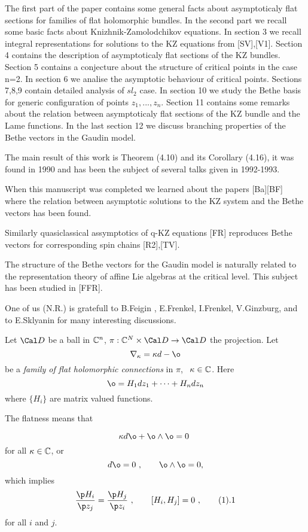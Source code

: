 The first part of the paper contains some general facts about
asymptoticaly flat sections for families of flat holomorphic
bundles. In the second part we recall some basic facts about
Knizhnik-Zamolodchikov equations. In section 3 we recall integral
representations for solutions to the KZ equations from [SV],[V1].
Section 4 contains the description of asymptoticaly flat sections
of the KZ bundles. Section 5 contains a conjecture about the structure
of critical points in the case n=2. In section 6 we analise the
asymptotic behaviour of critical points. Sections 7,8,9
contain detailed analysis of $sl_2$ case. In section 10
we study the Bethe basis for generic configuration of points
$z_1,...,z_n$. Section 11 contains some remarks about the
relation between asymptoticaly flat sections of the KZ bundle
and the Lame functions. In the last section 12 we discuss
branching properties of the Bethe vectors in the Gaudin model.

The main result of this work is Theorem (4.10) and its Corollary (4.16),
it was found in 1990 and
has been the subject of several talks given in 1992-1993.

When this manuscript was completed we learned about the papers [Ba][BF]
where the relation between asymptotic solutions to the KZ system
and the Bethe vectors has been found.

Similarly quasiclassical assymptotics of q-KZ equations [FR] reproduces
Bethe vectors for corresponding spin chains [R2],[TV].

The structure of the Bethe vectors for the Gaudin model is naturally related to
the representation theory of affine Lie algebras at the critical level.
This subject has been studied in [FFR].

One of us (N.R.) is gratefull to B.Feigin , E.Frenkel, I.Frenkel, V.Ginzburg,
and to E.Sklyanin for many interesting discussions.


\bigskip
{}

Let $\Cal D$ be a ball in $\Bbb C^n$, $\pi : \Bbb C ^N \times
 \Cal D\to\Cal D$ the projection. Let
$$
\nabla_\kappa = \kappa d-\o
$$
be a {\it family of flat holomorphic connections} in $\pi$, \
$\kappa\in\Bbb C$. Here
$$
\o = H_1 dz_1 +\dots + H_n dz_n
$$
where $\{ H_i\}$ are matrix valued functions.

The flatness means that

$$
\kappa d\o + \o\wedge\o = 0  \
$$
for all $\kappa\in\Bbb C$, or
$$
d\o = 0 \ , \qquad \o\wedge\o = 0,
$$
which implies
$$
\frac{\p H_i}{\p z_j} = \frac{\p H_j}{\p z_i} \ , \qquad
[H_i,H_j] = 0    \ ,   \tag 1.1
$$
for all $i$ and $j$.


